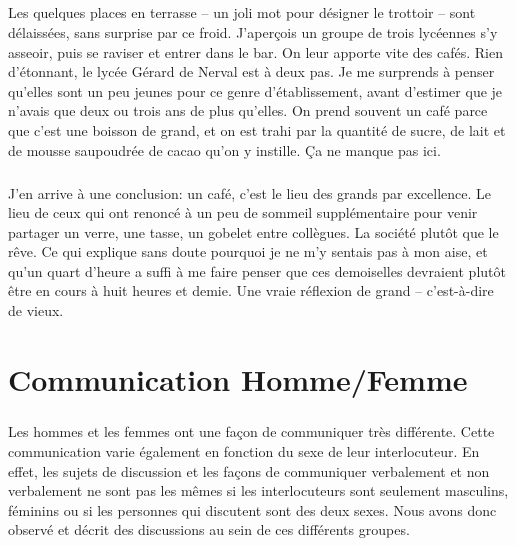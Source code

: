 \paragraph{} Les quelques places en terrasse – un joli mot pour désigner le
trottoir – sont délaissées, sans surprise par ce froid.  J'aperçois un groupe
de trois lycéennes s'y asseoir, puis se raviser et entrer dans le bar. On leur
apporte vite des cafés. Rien d'étonnant, le lycée Gérard de Nerval est à deux
pas. Je me surprends à penser qu'elles sont un peu jeunes pour ce genre
d'établissement, avant d'estimer que je n'avais que deux ou trois ans de plus
qu'elles. On prend souvent un café parce que c'est une boisson de grand, et on
est trahi par la quantité de sucre, de lait et de mousse saupoudrée de cacao
qu'on y instille. Ça ne manque pas ici.

\paragraph{} J'en arrive à une conclusion: un café, c'est le lieu des grands
par excellence. Le lieu de ceux qui ont renoncé à un peu de sommeil
supplémentaire pour venir partager un verre, une tasse, un gobelet entre
collègues. La société plutôt que le rêve. Ce qui explique sans doute pourquoi
je ne m'y sentais pas à mon aise, et qu'un quart d'heure a suffi à me faire
penser que ces demoiselles devraient plutôt être en cours à huit heures et
demie. Une vraie réflexion de grand – c'est-à-dire de vieux.

\chapter{Communication Homme/Femme}

\paragraph{} Les hommes et les femmes ont une façon de communiquer très
différente. Cette communication varie également en fonction du sexe de leur
interlocuteur. En effet, les sujets de discussion et les façons de communiquer
verbalement et non verbalement ne sont pas les mêmes si les interlocuteurs sont
seulement masculins, féminins ou si les personnes qui discutent sont des deux
sexes. Nous avons donc observé et décrit des discussions au sein de ces
différents groupes.

